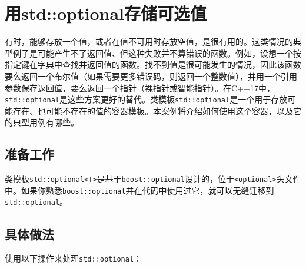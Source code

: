 \section{用std::optional存储可选值}



有时，能够存放一个值，或者在值不可用时存放空值，是很有用的。这类情况的典型例子是可能产生不了返回值、但这种失败并不算错误的函数。例如，设想一个按指定键在字典中查找并返回值的函数。找不到值是很可能发生的情况，因此该函数要么返回一个布尔值（如果需要更多错误码，则返回一个整数值），并用一个引用参数保存返回值，要么返回一个指针（裸指针或智能指针）。在C++17中，\texttt{std::\allowbreak{}optional}是这些方案更好的替代。类模板\texttt{std::\allowbreak{}optional}是一个用于存放可能存在、也可能不存在的值的容器模板。本案例将介绍如何使用这个容器，以及它的典型用例有哪些。



\subsection{准备工作}



类模板\texttt{std::\allowbreak{}optional<\allowbreak{}T>}是基于\texttt{boost::\allowbreak{}optional}设计的，位于\texttt{<\allowbreak{}optional>}头文件中。如果你熟悉\texttt{boost::\allowbreak{}optional}并在代码中使用过它，就可以无缝迁移到\texttt{std::\allowbreak{}optional}。



\subsection{具体做法}



使用以下操作来处理\texttt{std::\allowbreak{}optional}：



